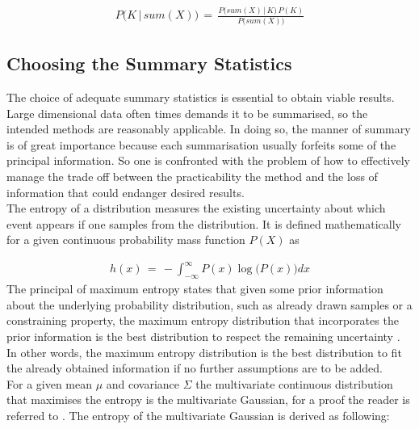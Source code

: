 \documentclass[a4paper, 11pt]{article}
\begin{document}
\begin{align*}
P\big(K \,|\, sum(X)\big)\, =\, \frac{P\big(sum(X)\, |\, K\big)\, P(K)}{P\big(sum(X)\big)}
\end{align*}

\subsection{Choosing the Summary Statistics}

The choice of adequate summary statistics is essential to obtain viable results. Large dimensional data often times demands it to be summarised, so the intended methods are reasonably applicable. In doing so, the manner of summary is of great importance because each summarisation usually forfeits some of the principal information. So one is confronted with the problem of how to effectively manage the trade off between the practicability the method and the loss of information that could endanger desired results.\\
The entropy of a distribution measures the existing uncertainty about which event appears if one samples from the distribution. It is defined mathematically for a given continuous probability mass function $P(X)$ as

\begin{align*}
h(x)\, =\, - \int_{-\infty}^{\infty}P(x)\log\big(P(x)\big)dx
\end{align*}
The principal of maximum entropy states that given some prior information about the underlying probability distribution, such as already drawn samples or a constraining property, the maximum entropy distribution that incorporates the prior information is the best distribution to respect the remaining uncertainty \parencite{jaynes1957information}. In other words, the maximum entropy distribution is the best distribution to fit the already obtained information if no further assumptions are to be added. \\
For a given mean $\mu$ and covariance $\Sigma$ the multivariate continuous distribution that maximises the entropy is the multivariate Gaussian, for a proof the reader is referred to \cite{cover2012elements}.
The entropy of the multivariate Gaussian is derived as following:
\end{document}
